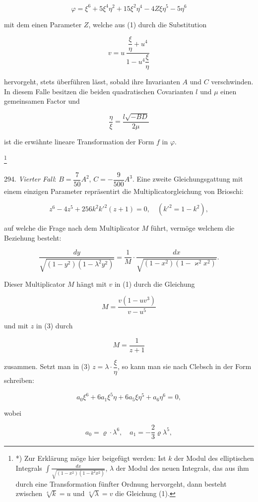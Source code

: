 \documentclass[11pt]{article}
\providecommand{\weberpage}[1]{}
\providecommand{\weq}[2]{\begin{equation}\tag{#1}#2\end{equation}}
\begin{document}
\weq{2}{\varphi = \xi^6 + 5\xi^4\eta^2 + 15\xi^2\eta^4 - 4Z\xi\eta^5 - 5\eta^6}

mit dem einen Parameter $Z$, welche aus (1) durch die Substitution

\[
v = u\,\frac{\dfrac{\xi}{\eta} + u^4}{1 - u^4\dfrac{\xi}{\eta}}
\]

hervorgeht, stets überführen lässt, sobald ihre Invarianten $A$ und $C$ verschwinden. In diesem Falle besitzen die beiden quadratischen Covarianten $l$ und $\mu$ einen gemeinsamen Factor und

\[
\frac{\eta}{\xi} = \frac{l\sqrt{-BD}}{2\mu}
\]

ist die erwähnte lineare Transformation der Form $f$ in $\varphi$.

\footnote{*) Zur Erklärung möge hier beigefügt werden: Ist $k$ der Modul des elliptischen Integrals $\displaystyle\int\frac{dx}{\sqrt{(1-x^2)(1-k^2x^2)}}$, $\lambda$ der Modul des neuen Integrals, das aus ihm durch eine Transformation fünfter Ordnung hervorgeht, dann besteht zwischen $\sqrt[4]{k}=u$ und $\sqrt[4]{\lambda}=v$ die Gleichung (1).}


\weberpage{319}

294. \textit{Vierter Fall}: $B=\dfrac{7}{50}A^2$, $C=-\dfrac{9}{500}A^3$. Eine zweite Gleichungsgattung mit einem einzigen Parameter repräsentirt die Multiplicatorgleichung von Brioschi:

\weq{3}{z^6 - 4z^5 + 256k^2k'^2(z+1) = 0, \quad (k'^2 = 1 - k^2),}

auf welche die Frage nach dem Multiplicator $M$ führt, vermöge welchem die Beziehung besteht:

\[
\frac{dy}{\sqrt{(1-y^2)(1-\lambda^2y^2)}} = \frac{1}{M}\cdot\frac{dx}{\sqrt{(1-x^2)(1-\varkappa^2x^2)}}.
\]

Dieser Multiplicator $M$ hängt mit $v$ in (1) durch die Gleichung

\[
M = \frac{v(1-uv^3)}{v-u^5}
\]

und mit $z$ in (3) durch

\[
M = \frac{1}{z+1}
\]

zusammen. Setzt man in (3) $z=\lambda\cdot\dfrac{\xi}{\eta}$, so kann man sie nach Clebsch in der Form schreiben:

\weq{4}{a_0\xi^6 + 6a_1\xi^5\eta + 6a_5\xi\eta^5 + a_6\eta^6 = 0,}

wobei

\[
a_0 = \varrho\cdot\lambda^6, \quad a_1 = -\frac{2}{3}\varrho\lambda^5,
\]
\end{document}
